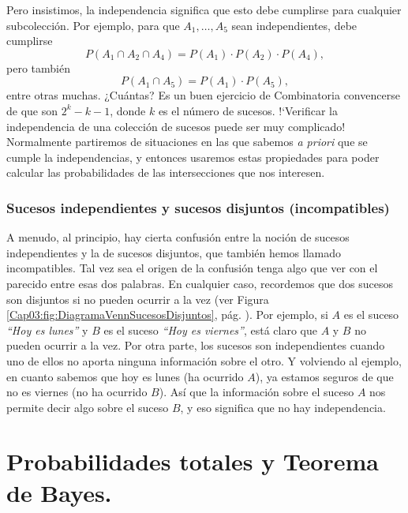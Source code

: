 Pero insistimos, la independencia significa que esto debe cumplirse para cualquier subcolección. Por ejemplo,  para que $A_1,\ldots,A_5$ sean independientes, debe cumplirse
\[P(A_1\cap A_2\cap A_4)=P(A_1)\cdot P(A_2)\cdot P(A_4),\]
pero también
\[P(A_1\cap A_5)=P(A_1)\cdot P(A_5),\]
entre otras muchas. ¿Cuántas? Es un buen ejercicio de Combinatoria convencerse de que son $2^k - k -1$, donde $k$ es el número de sucesos. {!`}Verificar la independencia de una colección de sucesos puede ser muy complicado! Normalmente partiremos de situaciones en las que sabemos {\em a priori} que se cumple la independencias, y entonces usaremos estas propiedades para poder calcular las probabilidades de las intersecciones que nos interesen.

\subsubsection{Sucesos independientes y sucesos disjuntos (incompatibles)}

A menudo, al principio, hay cierta confusión entre la noción de sucesos independientes y la de sucesos disjuntos, que también hemos llamado incompatibles. Tal vez sea el origen de la confusión tenga algo que ver con el parecido entre esas dos palabras.  En cualquier caso, recordemos que dos sucesos son disjuntos si no pueden ocurrir a la vez (ver Figura \ref{Cap03:fig:DiagramaVennSucesosDisjuntos}, pág. \pageref{Cap03:fig:DiagramaVennSucesosDisjuntos}). Por ejemplo, si $A$ es el suceso {\em ``Hoy es lunes''} y $B$ es el suceso {\em ``Hoy es viernes''}, está
claro que $A$ y $B$ no pueden ocurrir a la vez. Por otra parte, los sucesos son independientes cuando uno de ellos no aporta ninguna información sobre
el otro. Y volviendo al ejemplo, en cuanto sabemos que hoy es lunes (ha ocurrido $A$), ya estamos seguros de que no es viernes (no ha ocurrido $B$).
Así que la información sobre el suceso $A$ nos permite decir algo sobre el suceso $B$, y eso significa que no hay independencia.
        \begin{center}
        \end{center}

\section{Probabilidades totales y Teorema de Bayes.}
\label{cap03:sec:ProbabilidadesTotalesReglaBayes}


